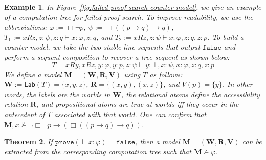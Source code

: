 \documentclass[copyright,creativecommons]{eptcs}
\newtheorem{theorem}{Theorem}[section]
\newtheorem{example}[theorem]{Example}
\newcommand{\iffi}{\textit{iff} }
\renewcommand{\phi}{\varphi}
\newcommand{\imp}{\rightarrow}
\newcommand{\lab}{\mathsf{Lab}}
\newcommand{\sar}{\vdash}
\newcommand{\tseq}{T} %
\newcommand{\fig}{Figure} %
\newcommand{\false}{\mathtt{false}}
\newcommand{\prove}{\mathtt{prove}}
\newcommand{\set}[1]{\{#1\}}
\newcommand{\M}{\mathbf{M}}
\newcommand{\W}{\mathbf{W}}
\newcommand{\R}{\mathbf{R}}
\newcommand{\V}{\mathbf{V}}
\begin{document}
\begin{example} In \fig~\ref{fig:failed-proof-search-counter-model}, we give an example of a computation tree for failed proof-search. To improve readability, we use the abbreviations: $\phi := \Box \neg p$, $\psi := \Box((p \rightarrow q)\rightarrow q)$, $\tseq_{1} := xRz, z:\psi, z: q \vdash x: \phi, z : q$, and $\tseq_{2} := xRz, z:\psi \vdash x: \phi, z : q, z : p$. To build a counter-model, we take the two stable line sequents that output $\false$ and perform a sequent composition to recover a tree sequent as shown below:
$$
\tseq = xRy, xRz, y:\phi, y : p, z:\psi \vdash y: \bot, x: \psi, x: \phi, z : q, z : p
$$
We define a model $\M = (\W,\R,\V)$ using $\tseq$ as follows: $\W := \lab(\tseq) = \set{x,y,z}$, $\R = \set{(x,y),(x,z)}$, and $V(p) = \set{y}$. In other words, the labels are the worlds in $\W$, the relational atoms define the accessibility relation $\R$, and propositional atoms are true at worlds \iffi they occur in the antecedent of $\tseq$ associated with that world. One can confirm that $\M, x \not\models \neg\Box \neg p \rightarrow ( \Box((p \rightarrow q)\rightarrow q))$.
\end{example}


\begin{theorem}\label{lem:false-gives-refute}
If $\prove( \sar x : \phi) = \false$, then a model $\M = (\W,\R,\V)$ can be extracted from the corresponding computation tree such that $\M \not\models \phi$.
\end{theorem}
\end{document}
